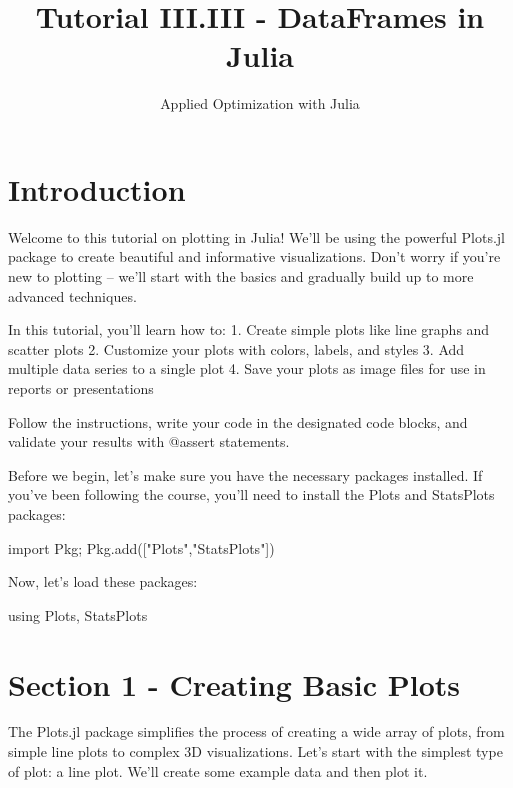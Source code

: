 \documentclass[
]{report}
\title{Tutorial III.III - DataFrames in Julia}
\subtitle{Applied Optimization with Julia}
\author{}
\date{}
\newenvironment{Shaded}{\begin{snugshade}}{\end{snugshade}}
\newcommand{\BuiltInTok}[1]{\textcolor[rgb]{0.00,0.23,0.31}{#1}}
\newcommand{\ImportTok}[1]{\textcolor[rgb]{0.00,0.46,0.62}{#1}}
\newcommand{\NormalTok}[1]{\textcolor[rgb]{0.00,0.23,0.31}{#1}}
\begin{document}
\maketitle


\chapter{Introduction}\label{introduction}

Welcome to this tutorial on plotting in Julia! We'll be using the
powerful Plots.jl package to create beautiful and informative
visualizations. Don't worry if you're new to plotting -- we'll start
with the basics and gradually build up to more advanced techniques.

In this tutorial, you'll learn how to: 1. Create simple plots like line
graphs and scatter plots 2. Customize your plots with colors, labels,
and styles 3. Add multiple data series to a single plot 4. Save your
plots as image files for use in reports or presentations

Follow the instructions, write your code in the designated code blocks,
and validate your results with @assert statements.

Before we begin, let's make sure you have the necessary packages
installed. If you've been following the course, you'll need to install
the Plots and StatsPlots packages:

\begin{Shaded}
\begin{Highlighting}[]
\ImportTok{import} \BuiltInTok{Pkg;}\NormalTok{ Pkg.add(["Plots",}\BuiltInTok{"StatsPlots"])}
\end{Highlighting}
\end{Shaded}

Now, let's load these packages:

\begin{Shaded}
\begin{Highlighting}[]
\ImportTok{using} \BuiltInTok{Plots}\NormalTok{, }\BuiltInTok{StatsPlots}
\end{Highlighting}
\end{Shaded}

\chapter{Section 1 - Creating Basic
Plots}\label{section-1---creating-basic-plots}

The Plots.jl package simplifies the process of creating a wide array of
plots, from simple line plots to complex 3D visualizations. Let's start
with the simplest type of plot: a line plot. We'll create some example
data and then plot it.
\end{document}
